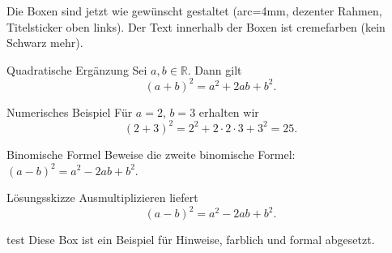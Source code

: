 \documentclass[11pt,a4paper,oneside]{article}
\begin{document}
	\newpage
	
	
	Die Boxen sind jetzt wie gewünscht gestaltet (arc=4mm, dezenter Rahmen, Titelsticker oben links). Der Text innerhalb der Boxen ist cremefarben (kein Schwarz mehr).
	
	\begin{theo}{Quadratische Ergänzung}
		Sei \(a,b\in \mathbb{R}\). Dann gilt
		\[
		(a+b)^2 = a^2 + 2ab + b^2.
		\]
	\end{theo}
	
	\begin{exem}{Numerisches Beispiel}
		Für \(a=2\), \(b=3\) erhalten wir
		\[
		(2+3)^2 = 2^2 + 2\cdot 2\cdot 3 + 3^2 = 25.
		\]
	\end{exem}
	
	\begin{aufgabe}{Binomische Formel}
		Beweise die zweite binomische Formel: \((a-b)^2 = a^2 - 2ab + b^2\).
	\end{aufgabe}
	
	\begin{loesung}{Lösungsskizze}
		Ausmultiplizieren liefert
		\[
		(a-b)^2 = a^2 - 2ab + b^2.
		\]
	\end{loesung}
	
	\begin{infobox}{test}
		Diese Box ist ein Beispiel für Hinweise, farblich und formal abgesetzt.
	\end{infobox}
	
\end{document}

